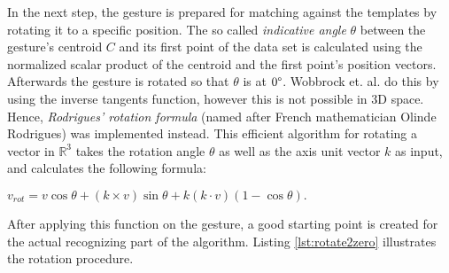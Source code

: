 

In the next step, the gesture is prepared for matching against the templates by rotating it to a specific position. The so called \textit{indicative angle} $\theta$ between the gesture's centroid $C$ and its first point of the data set is calculated using the normalized scalar product of the centroid and the first point's position vectors. Afterwards the gesture is rotated so that $\theta$ is at $0\degree$. Wobbrock et. al. do this by using the inverse tangents function, however this is not possible in 3D space. Hence, \textit{Rodrigues' rotation formula} (named after French mathematician Olinde Rodrigues) was implemented instead. This efficient algorithm for rotating a vector in $\mathbb{R}^3$ takes the rotation angle $\theta$ as well as the axis unit vector $k$ as input, and calculates the following formula:

\begin{center}
\(
v_{rot} = v \cos\theta + (k \times v)\sin\theta + k (k \cdot v) (1 - \cos\theta).
\) \cite{koks2006}
\end{center}

After applying this function on the gesture, a good starting point is created for the actual recognizing part of the algorithm. Listing \ref{lst:rotate2zero} illustrates the rotation procedure.

